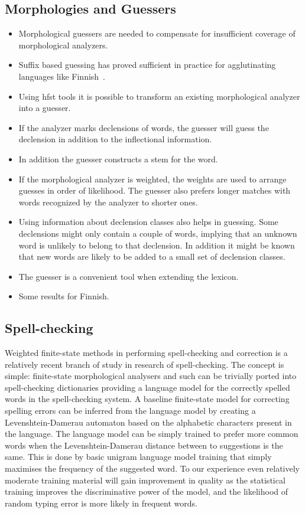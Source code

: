 \documentclass{llncs}
\begin{document}
\subsection{Morphologies and Guessers}
\label{sec: morph-guessers}
\begin{itemize}
\item Morphological guessers are needed to compensate for insufficient
  coverage of morphological analyzers.
\item Suffix based guessing has proved sufficient in practice for
  agglutinating languages like Finnish~\cite{linden/2009/nodalida}.
\item Using hfst tools it is possible to transform an existing morphological analyzer into a guesser. 
\item If the analyzer marks declensions of words, the guesser will
  guess the declension in addition to the inflectional information.
\item In addition the guesser constructs a stem for the word.
\item If the morphological analyzer is weighted, the weights are used
  to arrange guesses in order of likelihood. The guesser also prefers
  longer matches with words recognized by the analyzer to shorter
  ones.
\item Using information about declension classes also helps in
  guessing. Some declensions might only contain a couple of words,
  implying that an unknown word is unlikely to belong to that
  declension. In addition it might be known that new words are likely
  to be added to a small set of declension classes.
\item The guesser is a convenient tool when extending the lexicon.
\item Some results for Finnish.
\end{itemize}

\subsection{Spell-checking}

Weighted finite-state methods in performing spell-checking and correction is a
relatively recent branch of study in research of spell-checking. The concept is
simple: finite-state morphological analysers and such can be trivially ported
into spell-checking dictionaries providing a language model for the correctly
spelled words in the spell-checking system. A baseline finite-state model for
correcting spelling errors can be inferred from the language model by creating
a Levenshtein-Damerau automaton based on the alphabetic characters present in
the language. The language model can be simply trained to prefer more common
words when the Levenshtein-Damerau distance between to suggestions is the same.
This is done by basic unigram language model training that simply maximises
the frequency of the suggested word. To our experience even relatively moderate
training material will gain improvement in quality as the statistical training
improves the discriminative power of the model, and the likelihood of random
typing error is more likely in frequent words.
\end{document}
